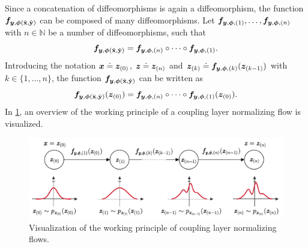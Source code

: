 \documentclass[a4paper,11pt]{report}
\def\lk#1{{\color{black}{#1}}}
\begin{document}
Since a concatenation of diffeomorphisms is again a diffeomorphism, the function $\bm{f}_{\bm{y},\bm{\phi}(\hat{\boldsymbol{\mathbf{x}}},\hat{\boldsymbol{\mathbf{y}}})}$ can be composed of many \lk{individual} diffeomorphisms. Let $\bm{f}_{\bm{y},\bm{\phi},(1)}, \dots, \bm{f}_{\bm{y},\bm{\phi},(n)}$ with $n \in \mathbb{N}$ be a number of diffeomorphisms, such that \begin{equation}
\bm{f}_{\bm{y},\bm{\phi}(\hat{\boldsymbol{\mathbf{x}}},\hat{\boldsymbol{\mathbf{y}}})} = \bm{f}_{\bm{y},\bm{\phi},(n)}\circ \dots \circ \bm{f}_{\bm{y},\bm{\phi},(1)}.
\end{equation} Introducing the notation $\bm{x} \doteq \bm{z}_{(0)}$, $\bm{z} \doteq \bm{z}_{(n)}$ and $\bm{z}_{(k)} \doteq \bm{f}_{\bm{y},\bm{\phi},(k)}(\bm{z}_{(k-1)})$ with $k \in \{1,\dots,n\}$, the function $\bm{f}_{\bm{y},\bm{\phi}(\hat{\boldsymbol{\mathbf{x}}},\hat{\boldsymbol{\mathbf{y}}})}$ can be written as \begin{equation}
\bm{f}_{\bm{y},\bm{\phi}(\hat{\boldsymbol{\mathbf{x}}},\hat{\boldsymbol{\mathbf{y}}})}(\bm{z}_{(0)}) = \bm{f}_{\bm{y},\bm{\phi},(n)}\circ \dots\circ \bm{f}_{\bm{y},\bm{\phi},(1)}(\bm{z}_{(0)}).
\end{equation} 
In \cref{fig:normflows}, an overview of the working principle of a coupling layer normalizing flow is visualized.
\begin{figure}[h!]
\centering
\includegraphics[width=\textwidth]{figures/normflows.pdf}
\caption{Visualization of the working principle of coupling layer normalizing flows.}
\label{fig:normflows}
\end{figure}
\end{document}
